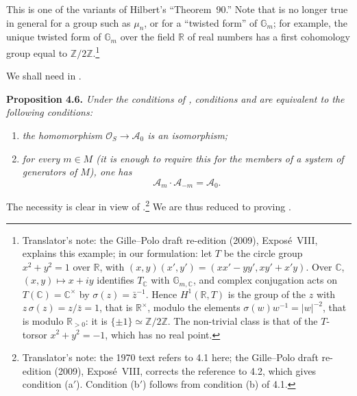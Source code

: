 This is one of the variants of Hilbert's ``Theorem~90.'' Note that
 is no longer true in general for a group such as
\(\mu_n\), or for a ``twisted form'' of \(\mathbb G_m\); for example,
the unique twisted form of \(\mathbb G_m\) over the field
\(\mathbb R\) of real numbers has a first cohomology group equal to
\(\mathbb Z/2\mathbb Z\).\footnote{Translator's note: the Gille--Polo draft re-edition (2009),
Expos\'e~VIII, explains this example; in our formulation: let \(T\) be the circle group
\(x^2+y^2=1\) over \(\mathbb R\), with \((x,y)(x',y')=(xx'-yy',xy'+x'y)\). Over \(\mathbb C\),
\((x,y)\mapsto x+iy\) identifies \(T_{\mathbb C}\) with \(\mathbb G_{m,\mathbb C}\), and complex
conjugation acts on \(T(\mathbb C)=\mathbb C^\times\) by \(\sigma(z)=\bar z^{-1}\). Hence
\(H^1(\mathbb R,T)\) is the group of the \(z\) with \(z\,\sigma(z)=z/\bar z=1\), that is
\(\mathbb R^\times\), modulo the elements \(\sigma(w)w^{-1}=|w|^{-2}\), that is modulo
\(\mathbb R_{>0}\): it is \(\{\pm1\}\simeq\mathbb Z/2\mathbb Z\). The non-trivial class is that of
the \(T\)-torsor \(x^2+y^2=-1\), which has no real point.}

We shall need  in .

\medskip
\noindent{}\textbf{Proposition 4.6.}
\textit{Under the conditions of
, conditions
 and
 are equivalent to
the following conditions:}
\begin{enumerate}
  \item[\((a')\)]
  \textit{the homomorphism
  \(\mathcal O_S\to\mathscr A_0\) is an isomorphism;}

  \item[\((b')\)]
  \textit{for every \(m\in M\) (it is enough to require this for the
  members of a system of generators of \(M\)), one has}
  \[
    \mathscr A_m\mathbin{\cdot}\mathscr A_{-m}=\mathscr A_0.
  \]
\end{enumerate}

The necessity is clear in view of
.\footnote{Translator's note: the 1970 text refers to 4.1
here; the Gille--Polo draft re-edition (2009), Expos\'e~VIII, corrects the reference to 4.2, which
gives condition (a\('\)). Condition (b\('\)) follows from condition (b) of 4.1.} We are thus reduced to proving
.


